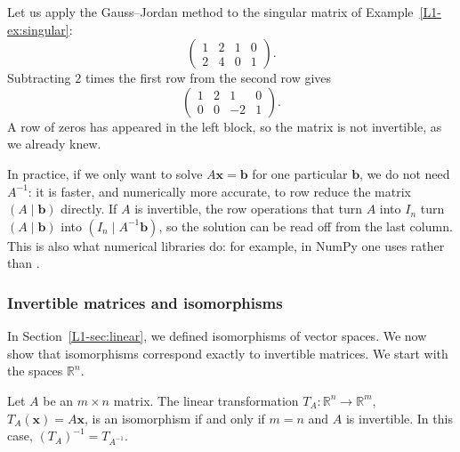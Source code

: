 \begin{example}
    Let us apply the Gauss--Jordan method to the singular matrix of Example~\ref{L1-ex:singular}:
    \[\left(\begin{array}{cc|cc}
        1 & 2 & 1 & 0 \\
        2 & 4 & 0 & 1
    \end{array}\right).\]
    Subtracting $2$ times the first row from the second row gives
    \[\left(\begin{array}{cc|cc}
        1 & 2 & 1 & 0 \\
        0 & 0 & -2 & 1
    \end{array}\right).\]
    A row of zeros has appeared in the left block, so the matrix is not invertible, as we already knew.
\end{example}

\begin{remark}\label{L1-rem:solve-practice}
    In practice, if we only want to solve $A\mathbf{x} = \mathbf{b}$ for one particular $\mathbf{b}$, we do not need $A^{-1}$: it is faster, and numerically more accurate, to row reduce the matrix $(A \mid \mathbf{b})$ directly. If $A$ is invertible, the row operations that turn $A$ into $I_n$ turn $(A \mid \mathbf{b})$ into $(I_n \mid A^{-1}\mathbf{b})$, so the solution can be read off from the last column. This is also what numerical libraries do: for example, in NumPy one uses  rather than .
\end{remark}

\subsubsection{Invertible matrices and isomorphisms}

In Section~\ref{L1-sec:linear}, we defined isomorphisms of vector spaces. We now show that isomorphisms correspond exactly to invertible matrices. We start with the spaces $\mathbb{R}^n$.

\begin{theorem}\label{L1-thm:TA-iso}
    Let $A$ be an $m \times n$ matrix. The linear transformation $T_A: \mathbb{R}^n \to \mathbb{R}^m$, $T_A(\mathbf{x}) = A\mathbf{x}$, is an isomorphism if and only if $m = n$ and $A$ is invertible. In this case, $(T_A)^{-1} = T_{A^{-1}}$.
\end{theorem}


